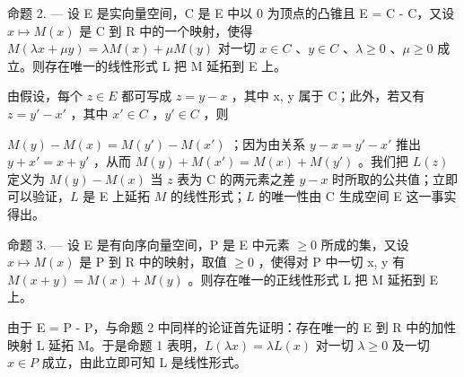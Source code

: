 命题 2. --- 设 E 是实向量空间，C 是 E 中以 0 为顶点的凸锥且 E = C - C，又设 \(x \mapsto M(x)\) 是 C 到 R 中的一个映射，使得 \(M(\lambda x + \mu y) = \lambda M(x) + \mu M(y)\) 对一切 \(x \in C\) 、\(y \in C\) 、\(\lambda \geqslant 0\) 、\(\mu \geqslant 0\) 成立。则存在唯一的线性形式 L 把 M 延拓到 E 上。

由假设，每个 \(z \in E\) 都可写成 \(z = y - x\) ，其中 x, y 属于 C；此外，若又有 \(z = y' - x'\) ，其中 \(x' \in C\) ，\(y' \in C\) ，则

\(M(y) - M(x) = M(y') - M(x')\) ；因为由关系 \(y - x = y' - x'\) 推出 \(y + x' = x + y'\) ，从而 \(M(y) + M(x') = M(x) + M(y')\) 。我们把 \(L(z)\) 定义为 \(M(y) - M(x)\) 当 \(z\) 表为 C 的两元素之差 \(y - x\) 时所取的公共值；立即可以验证，\(L\) 是 E 上延拓 \(M\) 的线性形式；\(L\) 的唯一性由 C 生成空间 E 这一事实得出。

命题 3. --- 设 E 是有向序向量空间，P 是 E 中元素 \(\geqslant 0\) 所成的集，又设 \(x \mapsto M(x)\) 是 P 到 R 中的映射，取值 \(\geqslant 0\) ，使得对 P 中一切 x, y 有 \(M(x + y) = M(x) + M(y)\) 。则存在唯一的正线性形式 L 把 M 延拓到 E 上。

由于 E = P - P，与命题 2 中同样的论证首先证明：存在唯一的 E 到 R 中的加性映射 L 延拓 M。于是命题 1 表明，\(L(\lambda x) = \lambda L(x)\) 对一切 \(\lambda \geqslant 0\) 及一切 \(x \in P\) 成立，由此立即可知 L 是线性形式。

